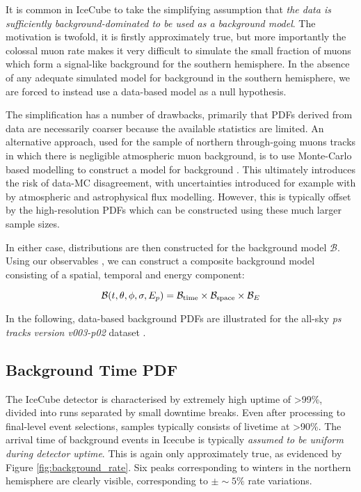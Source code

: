 It is common in IceCube to take the simplifying assumption that \emph{the data is sufficiently background-dominated to be used as a background model}. The motivation is twofold, it is firstly approximately true, but more importantly the colossal muon rate makes it very difficult to simulate the small fraction of muons which form a signal-like background for the southern hemisphere. In the absence of any adequate simulated model for background in the southern hemisphere, we are forced to instead use a data-based model as a null hypothesis. 

The simplification has a number of drawbacks, primarily that PDFs derived from data are necessarily coarser because the available statistics are limited. An alternative approach, used for the sample of northern through-going muons tracks in which there is negligible atmospheric muon background, is to use Monte-Carlo based modelling to construct a model for background . This ultimately introduces the risk of data-MC disagreement,  with uncertainties introduced for example with by atmospheric and astrophysical flux modelling. However, this is typically offset by the high-resolution PDFs which can be constructed using these much larger sample sizes.

In either case, distributions are then constructed for the background model $\mathcal{B}$. Using our observables , we can construct a composite background model consisting of a spatial, temporal and energy component:

\begin{equation}
\mathcal{B} (t, \theta, \phi, \sigma, E_{p}) =  \mathcal{B}_{\textup{time}} \times  \mathcal{B}_{\textup{space}} \times\mathcal{B}_{E}
\end{equation}

In the following, data-based background PDFs are illustrated for the all-sky \emph{ps tracks version v003-p02} dataset .

\subsection{Background Time PDF}

The IceCube detector is characterised by extremely high uptime of >99\%, divided into runs separated by small downtime breaks. Even after processing to final-level event selections, samples typically consists of livetime at >90\%. The arrival time of background events in Icecube is typically \emph{assumed to be uniform during detector uptime}. This is again only approximately true, as evidenced by Figure \ref{fig:background_rate}.  Six peaks corresponding to winters in the northern hemisphere are clearly visible, corresponding to $\pm \sim5\%$ rate variations.

